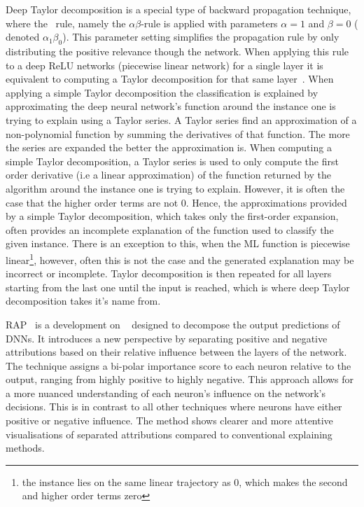 Deep Taylor decomposition is a special type of backward propagation technique, where the \LRP\ rule, namely the $\alpha\beta$-rule is applied with parameters $\alpha = 1$ and $\beta = 0$ ( denoted $\alpha_{1}\beta_{0}$). This parameter setting simplifies the propagation rule by only distributing the positive relevance though the network. When applying this rule to a deep ReLU networks (piecewise linear network) for a single layer it is equivalent to computing a Taylor decomposition for that same layer~\cite{MontavonLBSM17}. When applying a simple Taylor decomposition the classification is explained by approximating the deep neural network's function around the instance one is trying to explain using a Taylor series. A Taylor series find an approximation of a non-polynomial function by summing the derivatives of that function. The more the series are expanded the better the approximation is. When computing a simple Taylor decomposition, a Taylor series is used to only compute the first order derivative (i.e a linear approximation) of the function returned by the algorithm around the instance one is trying to explain. However, it is often the case that the higher order terms are not 0. Hence, the approximations provided by a simple Taylor decomposition, which takes only the first-order expansion, often provides an incomplete explanation of the function used to classify the given instance. There is an exception to this, when the ML function is piecewise linear\footnote{the instance lies on the same linear trajectory as 0, which makes the second and higher order terms zero}, however, often this is not the case and the generated explanation may be incorrect or incomplete. Taylor decomposition is then repeated for all layers starting from the last one until the input is reached, which is where deep Taylor decomposition takes it's name from.

RAP~\cite{NamGCWL20} is a development on \LRP~\cite{bach2015pixel} designed to decompose the output predictions of DNNs. It introduces a new perspective by separating positive and negative attributions based on their relative influence between the layers of the network. The technique assigns a bi-polar importance score to each neuron relative to the output, ranging from highly positive to highly negative. This approach allows for a more nuanced understanding of each neuron's influence on the network's decisions. This is in contrast to all other techniques where neurons have either positive or negative influence. The method shows clearer and more attentive visualisations of separated attributions compared to conventional explaining methods.


